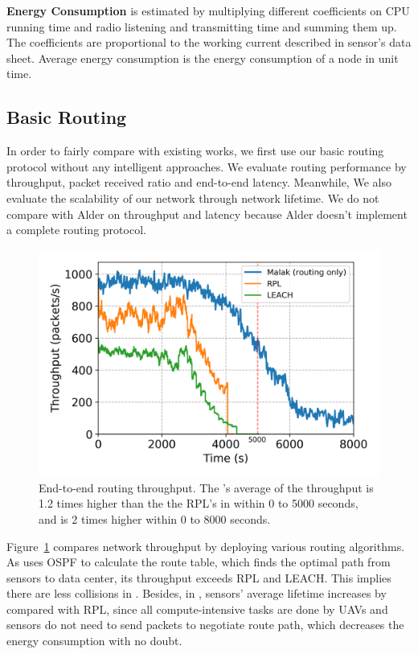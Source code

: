 \textbf{Energy Consumption} is estimated by multiplying different coefficients on
CPU running time and radio listening and transmitting time and summing them up.
The coefficients are proportional to the working current described in sensor's
data sheet. Average energy consumption is the energy consumption of a node in
unit time.

\subsection{Basic Routing}

In order to fairly compare with existing works, we first use our basic
{\sdn} routing protocol without any intelligent approaches. We evaluate routing
performance by throughput, packet received ratio and end-to-end latency.
Meanwhile, We also evaluate the scalability of our network through network
lifetime. We do not compare {\sdn} with Alder on throughput and latency because
Alder doesn't implement a complete routing protocol.

\begin{figure}[!h]
	\centering
	\includegraphics[width=.95\columnwidth]{Figure/throughput}
	\vspace{-0.1in}
	\caption{End-to-end routing throughput.
		\textnormal{
			The {\sdn}'s average of the throughput is 1.2 times higher than the
			the RPL's in within 0 to 5000 seconds, and is 2 times higher within 0
			to 8000 seconds.
	}}
	\label{fig:throughput}
\end{figure}

Figure~\ref{fig:throughput} compares network throughput by deploying various
routing algorithms. As {\sdn} uses OSPF to calculate the route table, which
finds the optimal path from sensors to data center, its throughput exceeds RPL
and LEACH. This implies there are less collisions in {\sdn}. Besides, in {\sdn},
sensors' average lifetime increases by {\totalLife} compared with RPL, since all
compute-intensive tasks are done by UAVs and sensors do not need to send
packets to negotiate route path, which decreases the energy consumption with no
doubt.

